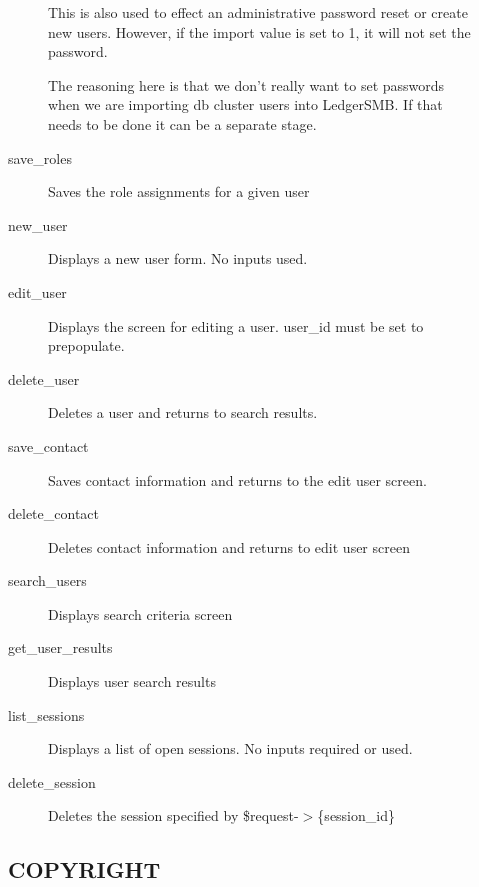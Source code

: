 \begin{description}
\begin{description}
This is also used to effect an administrative password reset or create new 
users.  However, if the import value is set to 1, it will not set the password.



The reasoning here is that we don't really want to set passwords when we are 
importing db cluster users into LedgerSMB.  If that needs to be done it can be
a separate stage.


\item[{save\_roles}] \mbox{}

Saves the role assignments for a given user


\item[{new\_user}] \mbox{}

Displays a new user form.  No inputs used.


\item[{edit\_user}] \mbox{}

Displays the screen for editing a user.  user\_id must be set to prepopulate.


\item[{delete\_user}] \mbox{}

Deletes a user and returns to search results.


\item[{save\_contact}] \mbox{}

Saves contact information and returns to the edit user screen.


\item[{delete\_contact}] \mbox{}

Deletes contact information and returns to edit user screen


\item[{search\_users}] \mbox{}

Displays search criteria screen


\item[{get\_user\_results}] \mbox{}

Displays user search results


\item[{list\_sessions}] \mbox{}

Displays a list of open sessions.  No inputs required or used.


\item[{delete\_session}] \mbox{}

Deletes the session specified by \$request-$>$\{session\_id\}

\end{description}
\subsection*{COPYRIGHT\label{LedgerSMB:Scripts::admin_COPYRIGHT}}



\end{description}
